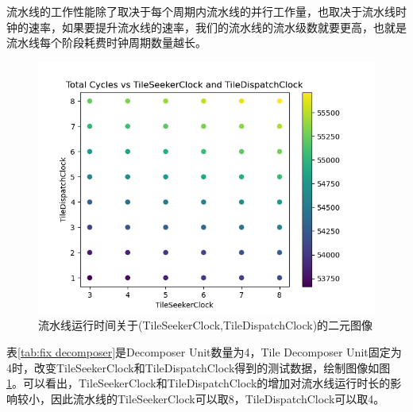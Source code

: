 流水线的工作性能除了取决于每个周期内流水线的并行工作量，也取决于流水线时钟的速率，如果要提升流水线的速率，我们的流水线的流水级数就要更高，也就是流水线每个阶段耗费时钟周期数量越长。
\begin{figure}[H]
    \centering
    \includegraphics[width=.5\linewidth]{figure/plot2.png}
    \caption{\label{fig:2 clock change}流水线运行时间关于(TileSeekerClock,TileDispatchClock)的二元图像}
\end{figure}
表\ref{tab:fix decomposer}是Decomposer Unit数量为4，Tile Decomposer Unit固定为4时，改变TileSeekerClock和TileDispatchClock得到的测试数据，绘制图像如图\ref{fig:2 clock change}。可以看出，TileSeekerClock和TileDispatchClock的增加对流水线运行时长的影响较小，因此流水线的TileSeekerClock可以取8，TileDispatchClock可以取4。
